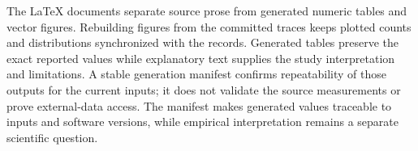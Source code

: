 The LaTeX documents separate source prose from generated numeric tables and vector figures. Rebuilding figures from the committed traces keeps plotted counts and distributions synchronized with the records. Generated tables preserve the exact reported values while explanatory text supplies the study interpretation and limitations. A stable generation manifest confirms repeatability of those outputs for the current inputs; it does not validate the source measurements or prove external-data access. The manifest makes generated values traceable to inputs and software versions, while empirical interpretation remains a separate scientific question.
